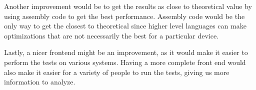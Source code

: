 \documentclass{article}
\begin{document}
Another improvement would be to get the results as close to theoretical value by using assembly code to get the best performance. Assembly code would be the only way to get the closest to theoretical since higher level languages can make optimizations that are not necessarily the best for a particular device. 

Lastly, a nicer frontend might be an improvement, as it would make it easier to perform the tests on various systems.  Having a more complete front end would also make it easier for a variety of people to run the tests, giving us more information to analyze.
\end{document}
